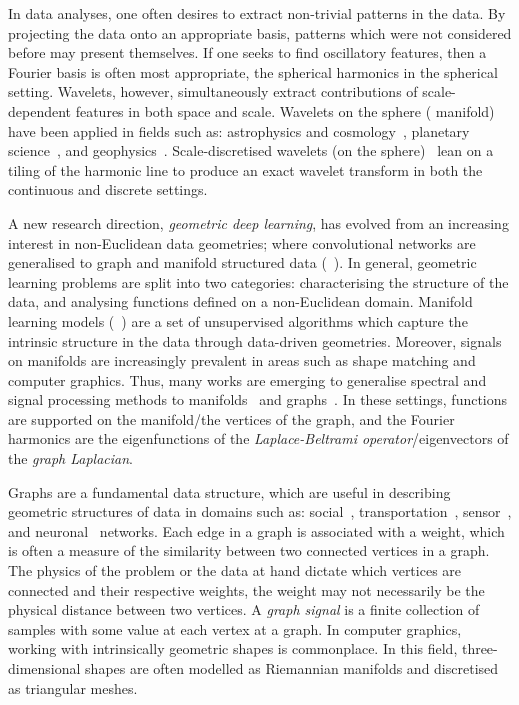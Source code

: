 In data analyses, one often desires to extract non-trivial patterns in the data.
By projecting the data onto an appropriate basis, patterns which were not considered before may present themselves.
If one seeks to find oscillatory features, then a Fourier basis is often most appropriate, \ie{} the spherical harmonics in the spherical setting.
Wavelets, however, simultaneously extract contributions of scale-dependent features in both space and scale.
Wavelets on the sphere (\cf{} manifold) have been applied in fields such as: astrophysics and cosmology~\cite{Pen1999,Barreiro2001,Rocha2004,McEwen2004}, planetary science~\cite{Audet2011,Audet2014}, and geophysics~\cite{Loris2010,Simons2011,Simons2011b}.
Scale-discretised wavelets (on the sphere)~\cite{Wiaux2008,McEwen2018,Leistedt2013,McEwen2013,McEwen2015} lean on a tiling of the harmonic line to produce an exact wavelet transform in both the continuous and discrete settings.

A new research direction, \emph{geometric deep learning}, has evolved from an increasing interest in non-Euclidean data geometries; where convolutional networks are generalised to graph and manifold structured data (\eg{}~\cite{Bronstein2017,Perlmutter2020}).
In general, geometric learning problems are split into two categories: characterising the structure of the data, and analysing functions defined on a non-Euclidean domain.
Manifold learning models (\eg{}~\cite{Tenenbaum2000,Coifman2006b,VanDerMaaten2008}) are a set of unsupervised algorithms which capture the intrinsic structure in the data through data-driven geometries.
Moreover, signals on manifolds are increasingly prevalent in areas such as shape matching and computer graphics.
Thus, many works are emerging to generalise spectral and signal processing methods to manifolds~\cite{Coifman2006} and graphs~\cite{Shuman2013}.
In these settings, functions are supported on the manifold/the vertices of the graph, and the Fourier harmonics are the eigenfunctions of the \emph{Laplace-Beltrami operator}/eigenvectors of the \emph{graph Laplacian}.

Graphs are a fundamental data structure, which are useful in describing geometric structures of data in domains such as: social~\cite{Nettleton2013}, transportation~\cite{Mohan2014}, sensor~\cite{Kenniche2010}, and neuronal~\cite{Tang2012} networks.
Each edge in a graph is associated with a weight, which is often a measure of the similarity between two connected vertices in a graph.
The physics of the problem or the data at hand dictate which vertices are connected and their respective weights, \ie{} the weight may not necessarily be the physical distance between two vertices.
A \emph{graph signal} is a finite collection of samples with some value at each vertex at a graph.
In computer graphics, working with intrinsically geometric shapes is commonplace.
In this field, three-dimensional shapes are often modelled as Riemannian manifolds and discretised as triangular meshes.

